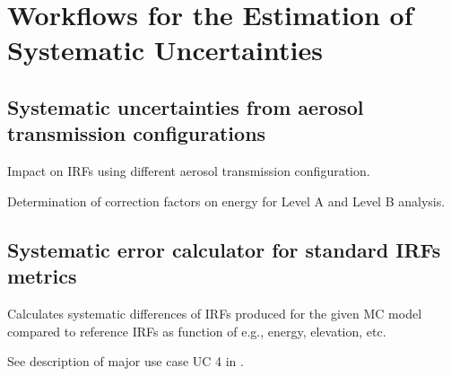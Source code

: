 \section{Workflows for the Estimation of Systematic Uncertainties}
\label{sect:Systematics}

\subsection{Systematic uncertainties from aerosol transmission configurations}

Impact on IRFs using different aerosol transmission configuration.

Determination of correction factors on energy for Level A and Level B analysis.

\subsection{Systematic error calculator for standard IRFs metrics}
\label{systematics:IRFmetric}

Calculates systematic differences of IRFs produced for the given MC model compared to reference IRFs as function of e.g., energy, elevation, etc.

See description of major use case UC 4 in \cite{CTAConcept}.